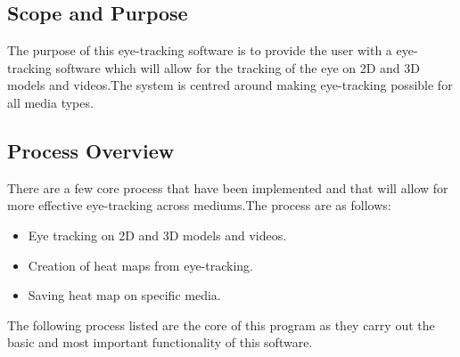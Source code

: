 \subsection{Scope and Purpose}
The purpose of this eye-tracking software is to provide the user with a eye-tracking software which will allow for the tracking of the eye on 2D and 3D models and videos.The system is centred around making eye-tracking possible for all media types.
\subsection{Process Overview }
There are a few core process that have been implemented and that will allow for more effective eye-tracking across mediums.The process are as follows:
\begin{itemize}
\item Eye tracking on 2D and 3D models and videos.
\item Creation of heat maps from eye-tracking.
\item Saving heat map on specific media.
\end{itemize}
The following process listed are the core of this program as they carry out the basic and most important functionality of this software.